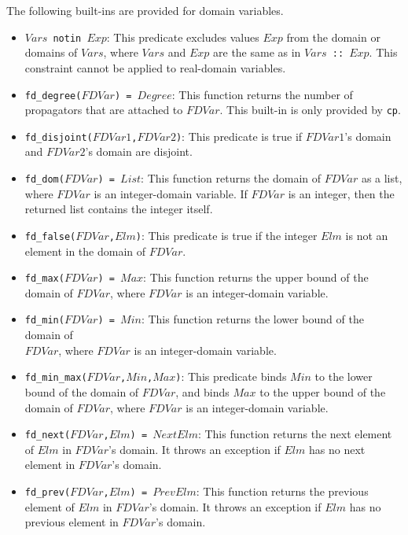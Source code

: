 The following built-ins are provided for domain variables.
\begin{itemize}
\item \texttt{$Vars$ notin $Exp$}: This predicate excludes values $Exp$ from the domain or domains of $Vars$, where $Vars$ and $Exp$ are the same as in \texttt{$Vars$ :: $Exp$}. This constraint cannot be applied to real-domain variables.
\item \texttt{fd\_degree($FDVar$) = $Degree$}: This function returns the number of propagators that are attached to $FDVar$. This built-in is only provided by {\tt cp}.
\item \texttt{fd\_disjoint($FDVar1$,$FDVar2$)}: This predicate is true if $FDVar1$'s domain and $FDVar2$'s domain are disjoint.
\item \texttt{fd\_dom($FDVar$) = $List$}: This function returns the domain of $FDVar$ as a list,  where $FDVar$ is an integer-domain variable. If $FDVar$ is an integer, then the returned list contains the integer itself.
\item \texttt{fd\_false($FDVar$,$Elm$)}: This predicate is true if the integer $Elm$ is not an element in the domain of $FDVar$.
\item \texttt{fd\_max($FDVar$) = $Max$}: This function returns the upper bound of the domain of $FDVar$, where $FDVar$ is an integer-domain variable.
\item \texttt{fd\_min($FDVar$) = $Min$}: This function returns the lower bound of the domain of \\ $FDVar$, where $FDVar$ is an integer-domain variable.
\item \texttt{fd\_min\_max($FDVar$,$Min$,$Max$)}: This predicate binds $Min$ to the lower bound of the domain of $FDVar$, and binds $Max$ to the upper bound of the domain of $FDVar$, where $FDVar$ is an integer-domain variable.
\item \texttt{fd\_next($FDVar$,$Elm$) = $NextElm$}: This function returns the next element of $Elm$ in $FDVar$'s domain. It throws an exception if $Elm$ has no next element in $FDVar$'s domain.
\item \texttt{fd\_prev($FDVar$,$Elm$) = $PrevElm$}: This function returns the previous element of $Elm$ in $FDVar$'s domain. It throws an exception if $Elm$ has no previous element in $FDVar$'s domain.

\end{itemize}
